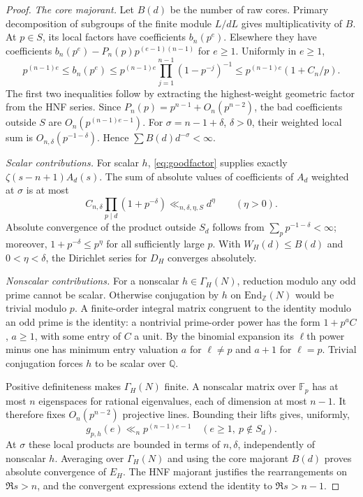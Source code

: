 \begin{proof}
\emph{The core majorant.}
Let $B(d)$ be the number of raw cores. Primary decomposition of subgroups of the finite module $L/dL$ gives multiplicativity of $B$. At $p\in S$, its local factors have coefficients $b_n(p^e)$. Elsewhere they have coefficients $b_n(p^e)-P_n(p)p^{(e-1)(n-1)}$ for $e\ge1$. Uniformly in $e\ge1$,
\[
 p^{(n-1)e}\le b_n(p^e)\le p^{(n-1)e}\prod_{j=1}^{n-1}(1-p^{-j})^{-1}
 \le p^{(n-1)e}(1+C_n/p).
\]
The first two inequalities follow by extracting the highest-weight
geometric factor from the HNF series. Since $P_n(p)=p^{n-1}+O_n(p^{n-2})$, the bad coefficients outside $S$ are $O_n(p^{(n-1)e-1})$. For $\sigma=n-1+\delta$, $\delta>0$, their weighted local sum is $O_{n,\delta}(p^{-1-\delta})$. Hence $\sum B(d)d^{-\sigma}<\infty$.

\emph{Scalar contributions.}
For scalar $h$, \eqref{eq:goodfactor} supplies exactly $\zeta(s-n+1)A_d(s)$. The sum of absolute values of coefficients of $A_d$ weighted at $\sigma$ is at most
\[
 C_{n,\delta}\prod_{p\mid d}(1+p^{-\delta})\ll_{n,\delta,\eta,S} d^\eta\qquad(\eta>0).
\]
Absolute convergence of the product outside $S_d$ follows from
$\sum_p p^{-1-\delta}<\infty$; moreover,
$1+p^{-\delta}\le p^\eta$ for all sufficiently large $p$.
With $W_H(d)\le B(d)$ and $0<\eta<\delta$, the Dirichlet series for $D_H$ converges absolutely.

\emph{Nonscalar contributions.}
For a nonscalar $h\in\Gamma_H(N)$, reduction modulo any odd prime cannot be scalar. Otherwise conjugation by $h$ on $\mathrm{End}_{\mathbb Z}(N)$ would be trivial modulo $p$. A finite-order integral matrix congruent to the identity modulo an odd prime is the identity: a nontrivial prime-order power has the form $1+p^a C$, $a\ge1$, with some entry of $C$ a unit. By the binomial expansion its $\ell$th power minus one has minimum entry valuation $a$ for $\ell\ne p$ and $a+1$ for $\ell=p$. Trivial conjugation forces $h$ to be scalar over $\mathbb Q$.

Positive definiteness makes $\Gamma_H(N)$ finite. A nonscalar matrix over $\mathbb F_p$ has at most $n$ eigenspaces for rational eigenvalues, each of dimension at most $n-1$. It therefore fixes $O_n(p^{n-2})$ projective lines. Bounding their lifts gives, uniformly,
\[
 g_{p,h}(e)\ll_n p^{(n-1)e-1}\quad(e\ge1,\ p\notin S_d).
\]
At $\sigma$ these local products are bounded in terms of
$n,\delta$, independently of nonscalar $h$. Averaging over
$\Gamma_H(N)$ and using the core majorant $B(d)$ proves absolute
convergence of $E_H$. The HNF majorant justifies the rearrangements on $\Re s>n$, and the convergent expressions extend the identity to $\Re s>n-1$.


\end{proof}
